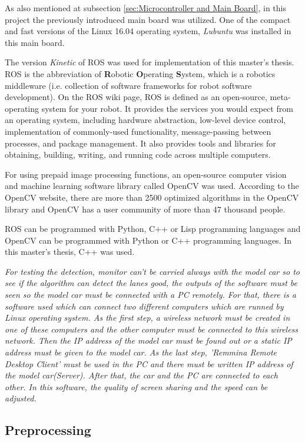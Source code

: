 As also mentioned at subsection \ref{sec:Microcontroller and Main Board}, in this project the previously introduced main board was utilized. One of the compact and fast versions of the Linux 16.04 operating system, \textit{Lubuntu} was installed in this main board.

The version \textit{Kinetic} of ROS was used for implementation of this master's thesis. ROS is the abbreviation of \textbf{R}obotic \textbf{O}perating \textbf{S}ystem, which is a robotics middleware (i.e. collection of software frameworks for robot software development). On the ROS wiki page\cite{ROS}, ROS is defined as an open-source, meta-operating system for your robot. It provides the services you would expect from an operating system, including hardware abstraction, low-level device control, implementation of commonly-used functionality, message-passing between processes, and package management. It also provides tools and libraries for obtaining, building, writing, and running code across multiple computers.

For using prepaid image processing functions, an open-source computer vision and machine learning software library called OpenCV was used. According to the OpenCV website\cite{OpenCV}, there are more than 2500 optimized algorithms in the OpenCV library and OpenCV has a user community of more than 47 thousand people.

ROS can be programmed with Python, C++ or Lisp programming languages and OpenCV can be programmed with Python or C++ programming languages. In this master's thesis, C++ was used.

\emph{\color{blue}For testing the detection, monitor can't be carried always with the model car so to see if the algorithm can detect the lanes good, the outputs of the software must be seen so the model car must be connected with a PC remotely. For that, there is a software used which can connect two different computers which are runned by Linux operating system. As the first step, a wireless network must be created in one of these computers and the other computer must be connected to this wireless network. Then the IP address of the model car must be found out or a static IP address must be given to the model car. As the last step, 'Remmina Remote Desktop Client' must be used in the PC and there must be written IP address of the model car(Server). After that, the car and the PC are connected to each other. In this software, the quality of screen sharing and the speed can be adjusted.  }

%
\subsection{Preprocessing}\label{sec:Preprocessing}

